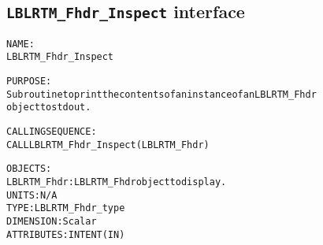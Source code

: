 \subsection{\texttt{LBLRTM\_Fhdr\_Inspect} interface}
  \label{sec:LBLRTM_Fhdr_Inspect_interface}
  \begin{alltt}
 
  NAME:
        LBLRTM_Fhdr_Inspect
 
  PURPOSE:
        Subroutine to print the contents of an instance of an LBLRTM_Fhdr
        object to stdout.
 
  CALLING SEQUENCE:
        CALL LBLRTM_Fhdr_Inspect( LBLRTM_Fhdr )
 
  OBJECTS:
        LBLRTM_Fhdr:   LBLRTM_Fhdr object to display.
                       UNITS:      N/A
                       TYPE:       LBLRTM_Fhdr_type
                       DIMENSION:  Scalar
                       ATTRIBUTES: INTENT(IN)
 
  \end{alltt}
